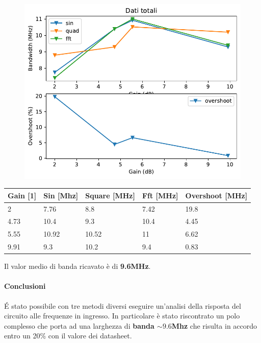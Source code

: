 \begin{figure}[!h]
    \centering
    \includegraphics[width=.5\linewidth]{analog/assets/OP27/Non Invertente/Non_Invert_Dati_tot.pdf}
        \label{fig:OP27 overshoot non invertente}
\end{figure}

\begin{table}[!h]
    \centering
    \begin{tabular}{|l|l|l|l|l|}
            \hline
            \textbf{Gain {[}1{]}} & \textbf{Sin {[}Mhz{]}} & \textbf{Square {[}MHz{]}} & \textbf{Fft {[}MHz{]}} & \textbf{Overshoot {[}MHz{]}} \\ \hline
            2             & 7.76         & 8.8             & 7.42         & 19.8               \\ \hline
            4.73          & 10.4         & 9.3             & 10.4         & 4.45               \\ \hline
            5.55          & 10.92        & 10.52           & 11           & 6.62               \\ \hline
            9.91          & 9.3          & 10.2            & 9.4          & 0.83               \\ \hline
        \end{tabular}
\end{table}

Il valor medio di banda ricavato è di \textbf{9.6MHz}.

\paragraph{Conclusioni}
 \'E stato possibile con tre metodi diversi eseguire un'analisi della risposta del circuito alle frequenze in ingresso. In particolare è stato riscontrato un polo complesso che porta ad una larghezza di \textbf{banda $\sim 9.6$Mhz} che risulta in accordo entro un 20\% con il valore dei datasheet.

